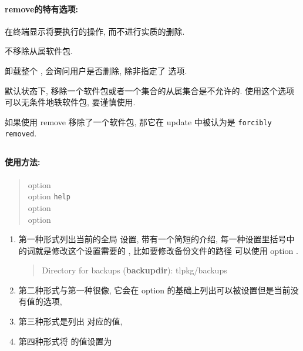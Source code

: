 \paragraph{\textmd{\ac{remove}}的特有选项:}
\begin{description}
    \item {}\par
    在终端显示将要执行的操作, 而不进行实质的删除.
    \item {}\par
    不移除从属软件包.
    \item {}\par
    卸载整个 \tl, 会询问用户是否删除, 除非指定了  选项. 
    \item {}\par
    默认状态下, 移除一个软件包或者一个集合的从属集合是不允许的. 使用这个选项可以无条件地轶软件包, 要谨慎使用. 

    如果使用 \tlmgr{} \ac{remove}  移除了一个软件包, 那它在 \tlmgr{} \ac{update}  中被认为是 \texttt{forcibly removed}. 
\end{description}

\clearpage

\subsection{}\label{subsec:option}
\paragraph{使用方法:}

\begin{quote}
    \tlmgr{} \ac{option} \\
    \tlmgr{} \ac{option} \texttt{help} \\
    \tlmgr{} \ac{option}  \\
    \tlmgr{} \ac{option}  
\end{quote}

\begin{enumerate}[(1)]
    \item 第一种形式列出当前的全局 \tl 设置, 带有一个简短的介绍, 每一种设置里括号中的词就是修改这个设置需要的 , 比如要修改备份文件的路径 可以使用 \tlmgr{} \ac{option}  . 
    \begin{quote}
        \ttfamily Directory for backups (\textbf{backupdir}): tlpkg/backups
    \end{quote}
    \item 第二种形式与第一种很像, 它会在 \tlmgr{} \ac{option} 的基础上列出可以被设置但是当前没有值的选项,
    \item 第三种形式是列出  对应的值,
    \item 第四种形式将  的值设置为 
\end{enumerate}

